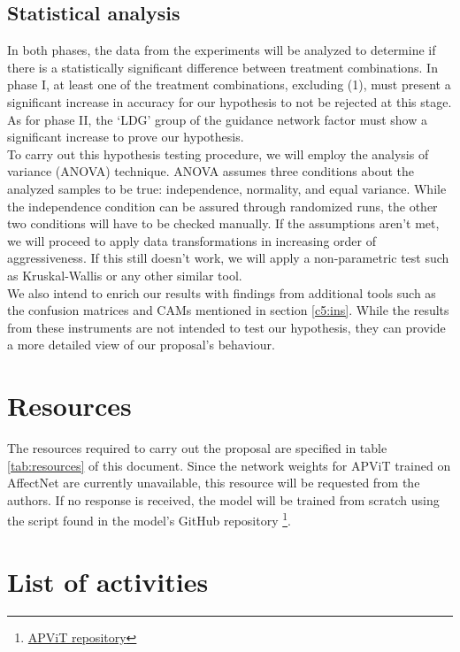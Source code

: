 \documentclass[../main.tex]{subfiles}
\begin{document}
\subsection{Statistical analysis}

In both phases, the data from the experiments will be analyzed to determine if there is a statistically significant difference between treatment combinations.
In phase I, at least one of the treatment combinations, excluding (1), must present a significant increase in accuracy for our hypothesis to not be rejected at this stage.
As for phase II, the `LDG' group of the guidance network factor must show a significant increase to prove our hypothesis.\\

To carry out this hypothesis testing procedure, we will employ the analysis of variance (ANOVA) technique.
ANOVA assumes three conditions about the analyzed samples to be true: independence, normality, and equal variance.
While the independence condition can be assured through randomized runs, the other two conditions will have to be checked manually.
If the assumptions aren't met, we will proceed to apply data transformations in increasing order of aggressiveness.
If this still doesn't work, we will apply a non-parametric test such as Kruskal-Wallis or any other similar tool.\\

We also intend to enrich our results with findings from additional tools such as the confusion matrices and CAMs mentioned in section \ref{c5:ins}.
While the results from these instruments are not intended to  test our hypothesis, they can provide a more detailed view of our proposal's behaviour.

\section{Resources}



The resources required to carry out the proposal are specified in table \ref{tab:resources} of this document.
Since the network weights for APViT trained on AffectNet are currently unavailable, this resource will be requested from the authors. 
If no response is received, the model will be trained from scratch using the script found in the model's GitHub repository \footnote{\href{https://github.com/youqingxiaozhua/APViT} {APViT repository}}.

\section{List of activities}
\end{document}
